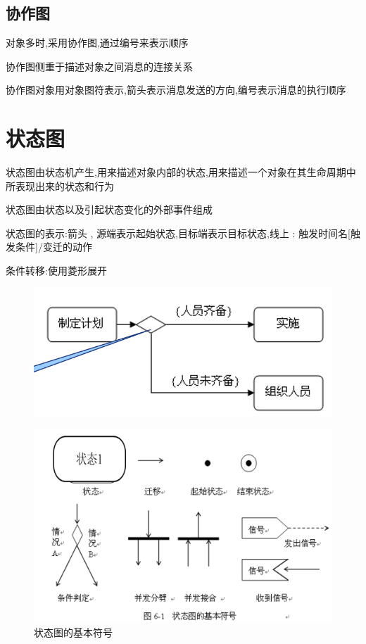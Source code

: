 \documentclass[UTF8,a4paper]{ctexart}
\begin{document}
\subsection{协作图}
对象多时,采用协作图,通过编号来表示顺序

协作图侧重于描述对象之间消息的连接关系

协作图对象用对象图符表示,箭头表示消息发送的方向,编号表示消息的执行顺序

\section{状态图}
状态图由状态机产生,用来描述对象内部的状态,用来描述一个对象在其生命周期中所表现出来的状态和行为

状态图由状态以及引起状态变化的外部事件组成

状态图的表示:箭头 , 源端表示起始状态,目标端表示目标状态,线上 : 触发时间名[触发条件]/变迁的动作

条件转移:使用菱形展开
\begin{figure}[H]
  \centering
  \includegraphics[scale = 0.3]{assets/SoftwareEngineering_e7bd4.png}
\end{figure}

\begin{figure}[H]
  \centering
  \includegraphics[scale = 0.3]{assets/SoftwareEngineering_a70d3.png}
  \caption{状态图的基本符号}
\end{figure}
\end{document}
